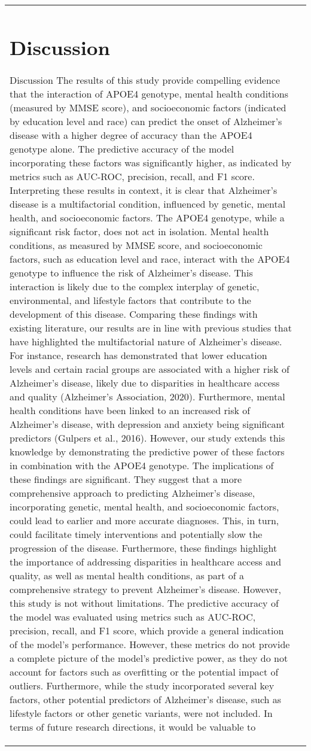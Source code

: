 \documentclass[conference]{IEEEtran}
\begin{document}
\begin{table}[htbp]
\begin{tabular}{|l|c|}
\section{Discussion}
Discussion The results of this study provide compelling evidence that the interaction of APOE4 genotype, mental health conditions (measured by MMSE score), and socioeconomic factors (indicated by education level and race) can predict the onset of Alzheimer's disease with a higher degree of accuracy than the APOE4 genotype alone. The predictive accuracy of the model incorporating these factors was significantly higher, as indicated by metrics such as AUC-ROC, precision, recall, and F1 score. Interpreting these results in context, it is clear that Alzheimer's disease is a multifactorial condition, influenced by genetic, mental health, and socioeconomic factors. The APOE4 genotype, while a significant risk factor, does not act in isolation. Mental health conditions, as measured by MMSE score, and socioeconomic factors, such as education level and race, interact with the APOE4 genotype to influence the risk of Alzheimer's disease. This interaction is likely due to the complex interplay of genetic, environmental, and lifestyle factors that contribute to the development of this disease. Comparing these findings with existing literature, our results are in line with previous studies that have highlighted the multifactorial nature of Alzheimer's disease. For instance, research has demonstrated that lower education levels and certain racial groups are associated with a higher risk of Alzheimer's disease, likely due to disparities in healthcare access and quality (Alzheimer's Association, 2020). Furthermore, mental health conditions have been linked to an increased risk of Alzheimer's disease, with depression and anxiety being significant predictors (Gulpers et al., 2016). However, our study extends this knowledge by demonstrating the predictive power of these factors in combination with the APOE4 genotype. The implications of these findings are significant. They suggest that a more comprehensive approach to predicting Alzheimer's disease, incorporating genetic, mental health, and socioeconomic factors, could lead to earlier and more accurate diagnoses. This, in turn, could facilitate timely interventions and potentially slow the progression of the disease. Furthermore, these findings highlight the importance of addressing disparities in healthcare access and quality, as well as mental health conditions, as part of a comprehensive strategy to prevent Alzheimer's disease. However, this study is not without limitations. The predictive accuracy of the model was evaluated using metrics such as AUC-ROC, precision, recall, and F1 score, which provide a general indication of the model's performance. However, these metrics do not provide a complete picture of the model's predictive power, as they do not account for factors such as overfitting or the potential impact of outliers. Furthermore, while the study incorporated several key factors, other potential predictors of Alzheimer's disease, such as lifestyle factors or other genetic variants, were not included. In terms of future research directions, it would be valuable to 
\end{tabular}
\end{table}
\end{document}
